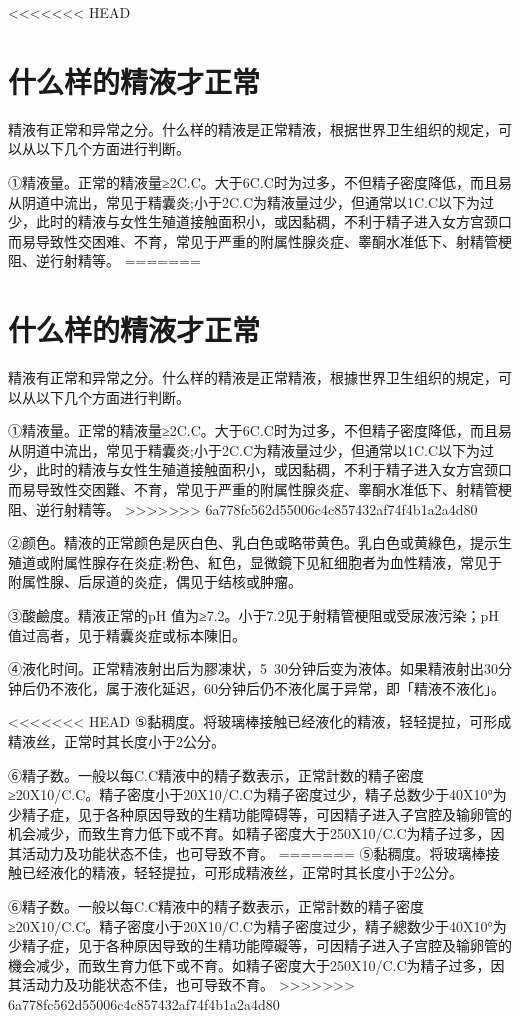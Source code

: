 \documentclass[12pt,UTF8]{ctexbook}
\begin{document}
<<<<<<< HEAD
\section{什么样的精液才正常}

精液有正常和异常之分。什么样的精液是正常精液，根据世界卫生组织的规定，可以从以下几个方面进行判断。

①精液量。正常的精液量≥2C.C。大于6C.C时为过多，不但精子密度降低，而且易从阴道中流出，常见于精囊炎;小于2C.C为精液量过少，但通常以1C.C以下为过少，此时的精液与女性生殖道接触面积小，或因黏稠，不利于精子进入女方宫颈口而易导致性交困难、不育，常见于严重的附属性腺炎症、睾酮水准低下、射精管梗阻、逆行射精等。
=======
\section{什么样的精液才正常}

精液有正常和异常之分。什么样的精液是正常精液，根據世界卫生组织的規定，可以从以下几个方面进行判断。

①精液量。正常的精液量≥2C.C。大于6C.C时为过多，不但精子密度降低，而且易从阴道中流出，常见于精囊炎;小于2C.C为精液量过少，但通常以1C.C以下为过少，此时的精液与女性生殖道接触面积小，或因黏稠，不利于精子进入女方宫颈口而易导致性交困難、不育，常见于严重的附属性腺炎症、睾酮水准低下、射精管梗阻、逆行射精等。
>>>>>>> 6a778fc562d55006c4c857432af74f4b1a2a4d80

②颜色。精液的正常颜色是灰白色、乳白色或略带黄色。乳白色或黄綠色，提示生殖道或附属性腺存在炎症;粉色、紅色，显微鏡下见紅细胞者为血性精液，常见于附属性腺、后尿道的炎症，偶见于结核或肿瘤。

③酸鹼度。精液正常的pH 值为≥7.2。小于7.2见于射精管梗阻或受尿液污染；pH值过高者，见于精囊炎症或标本陳旧。

④液化时间。正常精液射出后为膠凍状，5~30分钟后变为液体。如果精液射出30分钟后仍不液化，属于液化延迟，60分钟后仍不液化属于异常，即「精液不液化」。

<<<<<<< HEAD
⑤黏稠度。将玻璃棒接触已经液化的精液，轻轻提拉，可形成精液丝，正常时其长度小于2公分。

⑥精子数。一般以每C.C精液中的精子数表示，正常計数的精子密度≥20X10/C.C。精子密度小于20X10/C.C为精子密度过少，精子总数少于40X10°为少精子症，见于各种原因导致的生精功能障碍等，可因精子进入子宫腔及输卵管的机会减少，而致生育力低下或不育。如精子密度大于250X10/C.C为精子过多，因其活动力及功能状态不佳，也可导致不育。
=======
⑤黏稠度。将玻璃棒接触已经液化的精液，轻轻提拉，可形成精液丝，正常时其长度小于2公分。

⑥精子数。一般以每C.C精液中的精子数表示，正常計数的精子密度≥20X10/C.C。精子密度小于20X10/C.C为精子密度过少，精子總数少于40X10°为少精子症，见于各种原因导致的生精功能障礙等，可因精子进入子宫腔及输卵管的機会减少，而致生育力低下或不育。如精子密度大于250X10/C.C为精子过多，因其活动力及功能状态不佳，也可导致不育。
>>>>>>> 6a778fc562d55006c4c857432af74f4b1a2a4d80
\end{document}
